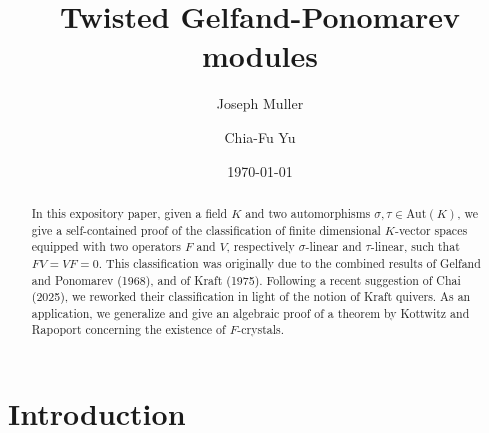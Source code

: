 \documentclass[12pt]{amsart}
\theoremstyle{definition}
\newcommand{\<}{\langle}   %
\renewcommand{\>}{\rangle} %
\begin{document}

\title{Twisted Gelfand-Ponomarev modules}

\author{Joseph Muller}
\address{(Muller)National Center for Theoretic Sciences, National Taiwan University, Taipei, Taiwan}

\author{Chia-Fu Yu}
\address{(Yu)Institute of Mathematics, Academia  Sinica, Taipei, Taiwan}

\date{\today}

\begin{abstract} 
In this expository paper, given a field $K$ and two automorphisms $\sigma, \tau \in \mathrm{Aut}(K)$, we give a self-contained proof of the classification of finite dimensional $K$-vector spaces equipped with two operators $F$ and $V$, respectively $\sigma$-linear and $\tau$-linear, such that $FV = VF = 0$. This classification was originally due to the combined results of Gelfand and Ponomarev (1968), and of Kraft (1975). Following a recent suggestion of Chai (2025), we reworked their classification in light of the notion of Kraft quivers. As an application, we generalize and give an algebraic proof of a theorem by Kottwitz and Rapoport concerning the existence of $F$-crystals. 
\end{abstract}

\maketitle
\setcounter{tocdepth}{2}
\tableofcontents

\section*{Introduction}
\end{document}
